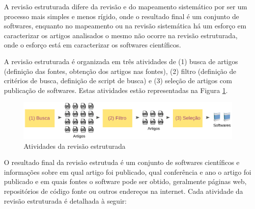 A revisão estruturada difere da revisão e do mapeamento sistemático
\cite{Kitchenham2007} por ser um processo mais simples e menos rígido, onde o
resultado final é um conjunto de softwares, enquanto no mapeamento ou na
revisão sistemática há um esforço em caracterizar os artigos analisados o mesmo
não ocorre na revisão estruturada, onde o esforço está em caracterizar os
softwares científicos.

A revisão estruturada é organizada em três atividades de (1) busca de artigos
(definição das fontes, obtenção dos artigos nas fontes), (2) filtro (definição
de critérios de busca, definição de script de busca) e (3) seleção de artigos
com publicação de softwares. Estas atividades estão representadas na Figura
\ref{figura-revisao-estruturada}.

\begin{figure}[h]
  \center
  \includegraphics[scale=0.21]{imagens/revisao-estruturada.png}
  \caption{Atividades da revisão estruturada}
  \label{figura-revisao-estruturada}
\end{figure}

O resultado final da revisão estrutuda é um conjunto de softwares científicos e
informações sobre em qual artigo foi publicado, qual conferência e ano o artigo
foi publicado e em quais fontes o software pode ser obtido, geralmente páginas
web, repositórios de código fonte ou outros endereços na internet. Cada
atividade da revisão estruturada é detalhada à seguir:

